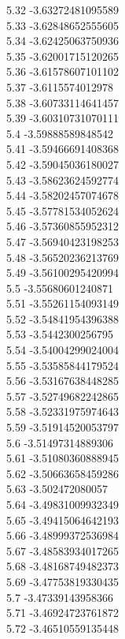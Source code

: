 {5.32	-3.63272481095589\\
5.33	-3.62848652555605\\
5.34	-3.62425063750936\\
5.35	-3.62001715120265\\
5.36	-3.61578607101102\\
5.37	-3.6115574012978\\
5.38	-3.60733114641457\\
5.39	-3.60310731070111\\
5.4	-3.59888589848542\\
5.41	-3.59466691408368\\
5.42	-3.59045036180027\\
5.43	-3.58623624592774\\
5.44	-3.58202457074678\\
5.45	-3.57781534052624\\
5.46	-3.57360855952312\\
5.47	-3.56940423198253\\
5.48	-3.56520236213769\\
5.49	-3.56100295420994\\
5.5	-3.55680601240871\\
5.51	-3.55261154093149\\
5.52	-3.54841954396388\\
5.53	-3.5442300256795\\
5.54	-3.54004299024004\\
5.55	-3.53585844179524\\
5.56	-3.53167638448285\\
5.57	-3.52749682242865\\
5.58	-3.52331975974643\\
5.59	-3.51914520053797\\
5.6	-3.51497314889306\\
5.61	-3.51080360888945\\
5.62	-3.50663658459286\\
5.63	-3.502472080057\\
5.64	-3.49831009932349\\
5.65	-3.49415064642193\\
5.66	-3.48999372536984\\
5.67	-3.48583934017265\\
5.68	-3.48168749482373\\
5.69	-3.47753819330435\\
5.7	-3.47339143958366\\
5.71	-3.46924723761872\\
5.72	-3.46510559135448\\
}
